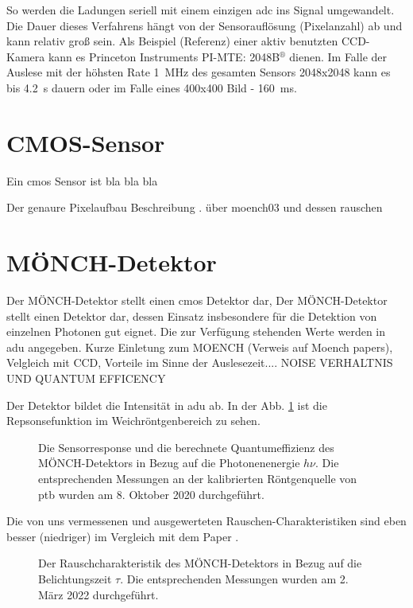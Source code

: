 \noindent
So werden die Ladungen seriell mit einem einzigen \gls{adc} ins Signal umgewandelt. Die Dauer dieses Verfahrens hängt von der Sensorauflösung (Pixelanzahl) ab und kann relativ groß sein. Als Beispiel (Referenz) einer aktiv benutzten CCD-Kamera kann es Princeton Instruments
PI-MTE: 2048B$^{\text{®}}$ dienen. Im Falle der Auslese mit der höhsten Rate \SI{1}{\mega\hertz} \cite[s. 81, Readout charakterstik]{mte-manual} des gesamten Sensors 2048x2048 kann es bis \SI{4,2}{\second} dauern oder im Falle eines 400x400 Bild - \SI{160}{\milli\second}. 


\section{CMOS-Sensor}
Ein \gls{cmos} Sensor ist bla bla bla

\noindent
Der genaure Pixelaufbau Beschreibung \cite{dinapoli_monch_2014}. über moench03 und dessen rauschen \cite{ramilli_measurements_2017}

\section{MÖNCH-Detektor}
Der MÖNCH-Detektor stellt einen \gls{cmos} Detektor dar,
Der MÖNCH-Detektor stellt einen Detektor dar, dessen Einsatz insbesondere für die Detektion von einzelnen Photonen gut eignet. Die zur Verfügung stehenden Werte werden in \gls{adu} angegeben. \cite{bergamaschi_monch_2018}
Kurze Einletung zum MOENCH (Verweis auf Moench papers), Velgleich mit CCD, Vorteile 
im Sinne der Auslesezeit.... NOISE VERHALTNIS  UND QUANTUM EFFICENCY

Der Detektor bildet die Intensität in \gls{adu} ab. In der Abb. \ref{fig:response_moench} ist die Repsonsefunktion im Weichröntgenbereich zu sehen. 
\begin{figure}[H]
    \centering
    
    \caption{Die Sensorresponse und die berechnete Quantumeffizienz des MÖNCH-Detektors in Bezug auf die Photonenenergie $h\nu$. Die entsprechenden Messungen an der kalibrierten Röntgenquelle von \gls{ptb} wurden am 8. Oktober 2020 durchgeführt.}
    \label{fig:response_moench}
\end{figure}
Die von uns vermessenen und ausgewerteten Rauschen-Charakteristiken sind eben besser (niedriger) im Vergleich mit dem Paper \cite{ramilli_measurements_2017}.
\begin{figure}[H]
    \centering
    
    \caption{Der Rauschcharakteristik des MÖNCH-Detektors in Bezug auf die Belichtungszeit $\tau$. Die entsprechenden Messungen wurden am 2. März 2022 durchgeführt.}
    \label{fig:noise_moench}
\end{figure}
